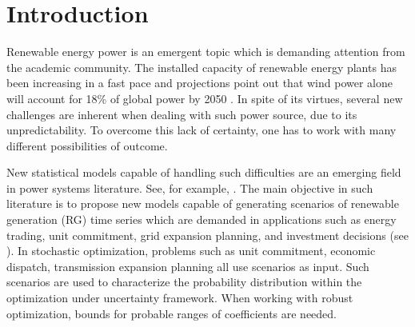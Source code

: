 \section{Introduction} \label{sec:introduction}


Renewable energy power is an emergent topic which is demanding attention from the academic community. %
The installed capacity of renewable energy plants has been increasing in a fast pace and projections point out that wind power alone will account for 18\% of global power by 2050 \cite{IntEnerAgency}.
In spite of its virtues, several new challenges are inherent when dealing with such power source, due to its unpredictability. To overcome this lack of certainty, one has to work with many different possibilities of outcome.

New statistical models capable of handling such difficulties are an emerging field in power systems literature. See, for example, \cite{bessa2012time, gallego2016line,moller_time-adaptive_2008,nielsen2006,bremnes_probabilistic_2004,wan_direct_2017}. 
The main objective in such literature is to propose new models capable of generating scenarios of renewable generation (RG) time series which are demanded in applications such as energy trading, unit commitment,  grid expansion planning, and investment decisions (see \cite{moreiraStreet,jabr2013robust,zhaoguan,Aderson2017}). 
In stochastic optimization, problems such as unit commitment, economic dispatch, transmission expansion planning all use scenarios as input. 
Such scenarios are used to characterize the probability distribution within the optimization under uncertainty framework.
When working with robust optimization, bounds for probable ranges of coefficients are needed.

 
